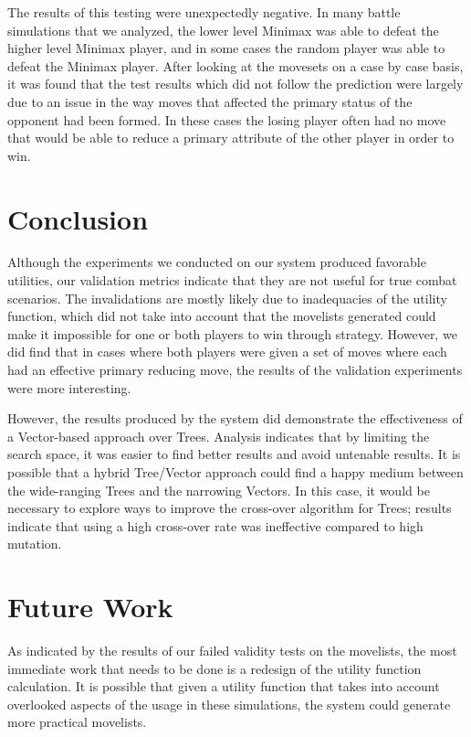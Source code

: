 \documentclass{acm_proc_article-sp}
\begin{document}
The results of this testing were unexpectedly negative. In many battle simulations that we analyzed, the lower level Minimax was able to defeat the higher level Minimax player, and in some cases the random player was able to defeat the Minimax player. After looking at the movesets on a case by case basis, it was found that the test results which did not follow the prediction were largely due to an issue in the way moves that affected the primary status of the opponent had been formed. In these cases the losing player often had no move that would be able to reduce a primary attribute of the other player in order to win.
    
    \section{Conclusion}
    
    Although the experiments we conducted on our system produced favorable utilities, our validation metrics indicate that they are not useful for true combat scenarios. The invalidations are mostly likely due to inadequacies of the utility function, which did not take into account that the movelists generated could make it impossible for one or both players to win through strategy. However, we did find that in cases where both players were given a set of moves where each had an effective primary reducing move, the results of the validation experiments were more interesting.
    
    However, the results produced by the system did demonstrate the effectiveness of a Vector-based approach over Trees. Analysis indicates that by limiting the search space, it was easier to find better results and avoid untenable results. It is possible that a hybrid Tree/Vector approach could find a happy medium between the wide-ranging Trees and the narrowing Vectors. In this case, it would be necessary to explore ways to improve the cross-over algorithm for Trees; results indicate that using a high cross-over rate was ineffective compared to high mutation. 
    
    \section{Future Work}

    As indicated by the results of our failed validity tests on the movelists, the most immediate work that needs to be done is a redesign of the utility function calculation. It is possible that given a utility function that takes into account overlooked aspects of the usage in these simulations, the system could generate more practical movelists.
\end{document}
